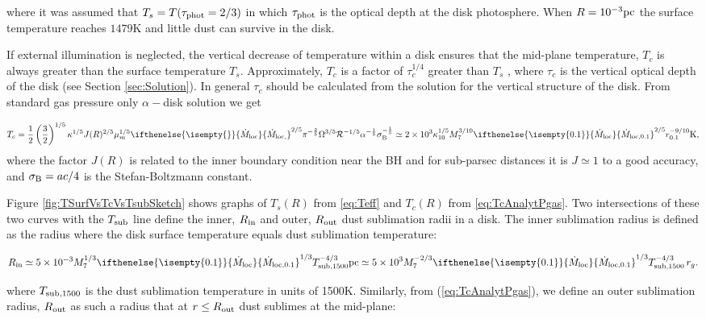 \documentclass[12pt,english,preprint]{aastex}
\newcommand{\su}[2]{#1_{\rm #2}}
\newcommand{\mdt}[1][]{ 
  \ifthenelse{\isempty{#1}}
  {\dot{M}_{\rm loc}}
  { {\dot M}_{\rm{loc},{#1}} } 
  } %
\newcommand{\Rout}{\su{R}{out}}
\newcommand{\Tsub}{ \su{T}{sub} }
\begin{document}
\noindent where it was assumed that $T_{s}=T(\tau_{{\rm phot}}=2/3)$ in which
$\tau_{{\rm phot}}$ is the optical depth at the disk photosphere.
When $R=10^{-3}{\rm pc}$ the surface temperature reaches 
$1479$K and little dust can survive in the disk.

If external illumination is neglected, 
the vertical decrease of temperature
within a disk ensures that the mid-plane temperature, $T_c$
is always greater than the surface temperature $T_{s}$. Approximately, 
$T_{c}$ is a factor of $\tau_{c}^{1/4}$ greater than $T_{s}$
, where $\tau_{c}$ is the vertical optical depth of the disk (see Section \ref{sec:Solution}). 
In general $\tau_{c}$ should be calculated from the solution for
the vertical structure of the disk. From standard gas pressure only
$\alpha-$disk solution we get

\begin{equation}
T_c=\frac{1}{2}\left(\frac{3}{2}\right)^{1/5}\kappa^{1/5}J(R)^{2/5}\mu_m^{1/5}
\text{\ensuremath{ \mdt }}^{2/5}\pi^{-\frac{2}{5}}\Omega^{3/5}{\cal R}^{-1/5}
\alpha^{-\frac{1}{5}}\su{\sigma}{B}^{-\frac{1}{5}}\simeq2\times10^{3}\kappa_{10}^{1/5}M_{7}^{3/10}
\text{\ensuremath{\mdt[0.1]}}^{2/5}r_{0.1}^{-9/10}{\rm K}\mbox{,}\label{eq:TcAnalytPgas}
\end{equation}
where the factor $J(R)$ is related to the inner boundary condition near the BH and for sub-parsec distances
it is $J\simeq1$ to a good accuracy, and $\su{\sigma}{B}= ac/4$ is the Stefan-Boltzmann constant.

Figure \ref{fig:TSurfVsTcVsTsubSketch} shows graphs of
$T_s(R)$ from \eqref{eq:Teff} and $T_c(R)$ from 
\eqref{eq:TcAnalytPgas}. Two intersections of these two curves with the
$\Tsub$ line define the inner, $\su{R}{in}$ and outer, $\su{R}{out}$ dust sublimation
radii in a disk.
The inner sublimation radius
is defined as the radius where the disk surface temperature equals 
dust sublimation temperature:

\begin{equation}
\su{R}{in}\simeq5\times10^{-3}M_{7}^{1/3}\mdt[0.1]^{1/3}\su{T}{sub,1500}
^{-4/3}{\rm pc}\simeq5\times10^{3}M_{7}^{-2/3}\mdt[0.1]^{1/3}\su{T}{sub,1500}^{-4/3}\,r_g.\label{eq:Rin}
\end{equation}

\noindent where $\su{T}{sub,1500}$ is the dust sublimation temperature in units of 1500K.  
Similarly, from (\ref{eq:TcAnalytPgas}), we define an outer sublimation radius, $R_{{\rm out}}$
as such a radius that at $r\le \Rout$ dust sublimes at the mid-plane:
\end{document}
